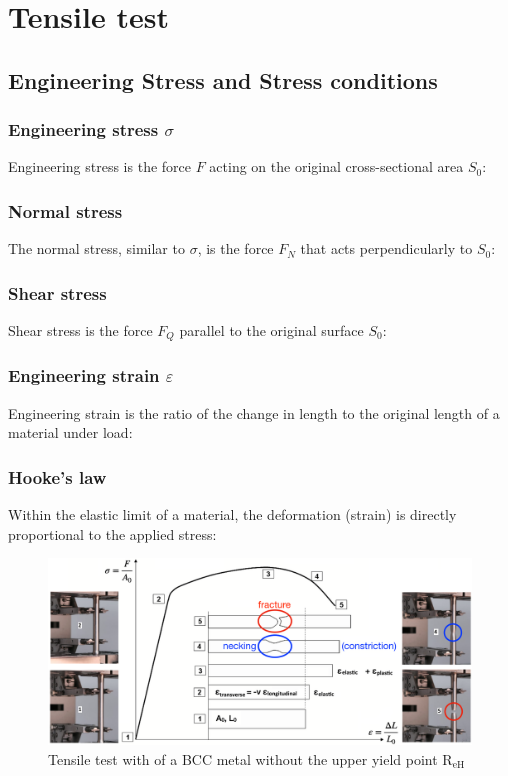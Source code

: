 \documentclass{article}
\begin{document}
\section{Tensile test}
\subsection{Engineering Stress and Stress conditions}
\subsubsection{Engineering stress $\sigma$}
Engineering stress is the force $F$ acting on the original cross-sectional
area $S_0$:

\subsubsection{Normal stress}
The normal stress, similar to $\sigma$, is the force $F_N$ that acts
perpendicularly to $S_0$:

\newpage
\subsubsection{Shear stress}
Shear stress is the force $F_Q$ parallel to the original surface $S_0$:

\subsubsection{Engineering strain $\varepsilon$}
Engineering strain is the ratio of the change in length to the
original length of a material under load:

\subsubsection{Hooke's law}
Within the elastic limit of a material, the deformation (strain) is directly proportional
to the applied stress:

\begin{figure}[ht!]
  \centering
  \includegraphics[width=\textwidth]{media/tensile_test.png}
  \caption*{Tensile test with of a BCC metal without the upper yield point R$_\text{eH}$}
\end{figure}
\end{document}
